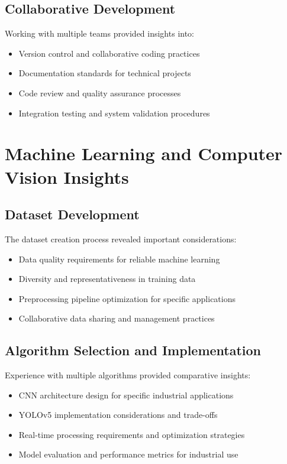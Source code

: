 \documentclass{book}
\begin{document}
\subsection{Collaborative Development}
\par\noindent Working with multiple teams provided insights into:

\begin{itemize}
\item Version control and collaborative coding practices
\item Documentation standards for technical projects
\item Code review and quality assurance processes
\item Integration testing and system validation procedures
\end{itemize}

\section{Machine Learning and Computer Vision Insights}

\subsection{Dataset Development}
\par\noindent The dataset creation process revealed important considerations:

\begin{itemize}
\item Data quality requirements for reliable machine learning
\item Diversity and representativeness in training data
\item Preprocessing pipeline optimization for specific applications
\item Collaborative data sharing and management practices
\end{itemize}

\subsection{Algorithm Selection and Implementation}
\par\noindent Experience with multiple algorithms provided comparative insights:

\begin{itemize}
\item CNN architecture design for specific industrial applications
\item YOLOv5 implementation considerations and trade-offs
\item Real-time processing requirements and optimization strategies
\item Model evaluation and performance metrics for industrial use
\end{itemize}
\end{document}
